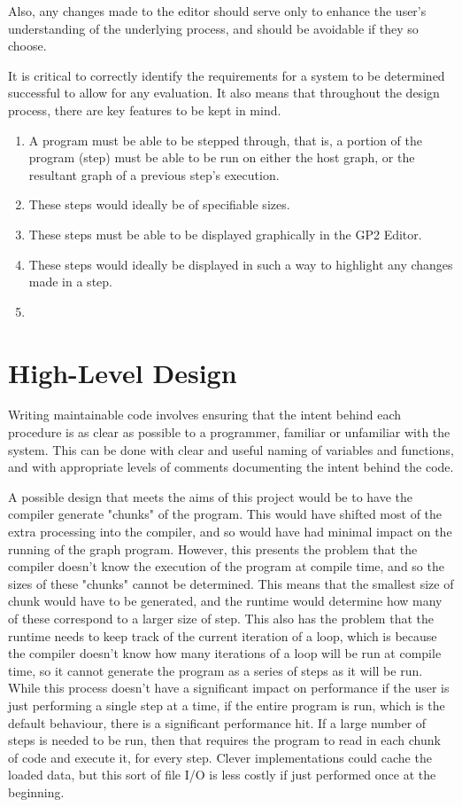 \documentclass{UoYCSproject}
\begin{document}
Also, any changes made to the editor should serve only to enhance the user's understanding of the underlying process, and should be avoidable if they so choose.

It is critical to correctly identify the requirements for a system to be determined successful to allow for any evaluation. It also means that throughout the design process, there are key features to be kept in mind.
\begin{enumerate}
	\item A program must be able to be stepped through, that is, a portion of the program (step) must be able to be run on either the host graph, or the resultant graph of a previous step's execution.
	\item These steps would ideally be of specifiable sizes.
	\item These steps must be able to be displayed graphically in the GP2 Editor.
	\item These steps would ideally be displayed in such a way to highlight any changes made in a step.
	\item 
\end{enumerate}

\section{High-Level Design}
Writing maintainable code involves ensuring that the intent behind each procedure is as clear as possible to a programmer, familiar or unfamiliar with the system. This can be done with clear and useful naming of variables and functions, and with appropriate levels of comments documenting the intent behind the code.

A possible design that meets the aims of this project would be to have the compiler generate "chunks" of the program. This would have shifted most of the extra processing into the compiler, and so would have had minimal impact on the running of the graph program. %
However, this presents the problem that the compiler doesn't know the execution of the program at compile time, and so the sizes of these "chunks" cannot be determined. This means that the smallest size of chunk would have to be generated, and the runtime would determine how many of these correspond to a larger size of step. This also has the problem that the runtime needs to keep track of the current iteration of a loop, which is because the compiler doesn't know how many iterations of a loop will be run at compile time, so it cannot generate the program as a series of steps as it will be run. While this process doesn't have a significant impact on performance if the user is just performing a single step at a time, if the entire program is run, which is the default behaviour, there is a significant performance hit. If a large number of steps is needed to be run, then that requires the program to read in each chunk of code and execute it, for every step. Clever implementations could cache the loaded data, but this sort of file I/O is less costly if just performed once at the beginning.
\end{document}
